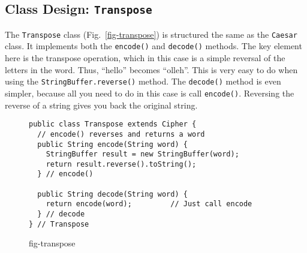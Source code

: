 \subsection{Class Design: {\tt Transpose} }
\noindent The {\tt Transpose} class (Fig.~\ref{fig-transpose}) is
structured the same as the {\tt Caesar} class.  It implements both the
{\tt encode()} and {\tt decode()} methods.  The key element here is
the transpose operation, which in this case is a simple reversal of
the letters in the word.  Thus, ``hello'' becomes ``olleh''.  This is
very easy to do when using the {\tt StringBuffer.reverse()} method.  The
{\tt decode()} method is even simpler, because all you need to do in
this case is call {\tt encode()}. Reversing the reverse of a string
gives you back the original string.

\begin{figure}[h!]
\jjjprogstart
\begin{jjjlisting}
\begin{lstlisting}
public class Transpose extends Cipher {
  // encode() reverses and returns a word
  public String encode(String word) {
    StringBuffer result = new StringBuffer(word);
    return result.reverse().toString(); 
  } // encode()

  public String decode(String word) {
    return encode(word);         // Just call encode
  } // decode
} // Transpose
\end{lstlisting}
\end{jjjlisting}
{fig-transpose}
\end{figure}

